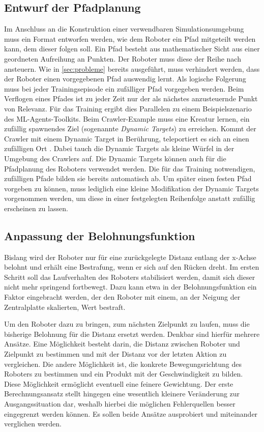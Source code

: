 \subsection{Entwurf der Pfadplanung}
Im Anschluss an die Konstruktion einer verwendbaren Simulationsumgebung muss ein Format entworfen werden, wie dem Roboter ein Pfad mitgeteilt werden kann, dem dieser folgen soll.
Ein Pfad besteht aus mathematischer Sicht aus einer geordneten Aufreihung an Punkten.
Der Roboter muss diese der Reihe nach ansteuern.
Wie in \autoref{sec:probleme} bereits ausgeführt, muss verhindert werden, dass der Roboter einen vorgegebenen Pfad auswendig lernt.
Als logische Folgerung muss bei jeder Trainingsepisode ein zufälliger Pfad vorgegeben werden.
Beim Verflogen eines Pfades ist zu jeder Zeit nur der als nächstes anzusteuernde Punkt von Relevanz.
Für das Training ergibt dies Parallelen zu einem Beispielszenario des ML-Agents-Toolkits.
Beim Crawler-Example muss eine Kreatur lernen, ein zufällig spawnendes Ziel (sogenannte \emph{Dynamic Targets}) zu erreichen.
Kommt der Crawler mit einem Dynamic Target in Berührung, teleportiert es sich an einen zufälligen Ort \cite{crawlerExample}.
Dabei tauch die Dynamic Targets als kleine Würfel in der Umgebung des Crawlers auf.
Die Dynamic Targets können auch für die Pfadplanung des Roboters verwendet werden.
Die für das Training notwendigen, zufälligen Pfade bilden sie bereits automatisch ab.
Um später einen festen Pfad vorgeben zu können, muss lediglich eine kleine Modifikation der Dynamic Targets vorgenommen werden, um diese in einer festgelegten Reihenfolge anstatt zufällig erscheinen zu lassen.

\subsection{Anpassung der Belohnungsfunktion}
Bislang wird der Roboter nur für eine zurückgelegte Distanz entlang der x-Achse belohnt und erhält eine Bestrafung, wenn er sich auf den Rücken dreht.
Im ersten Schritt soll das Laufverhalten des Roboters stabilisiert werden, damit sich dieser nicht mehr springend fortbewegt.
Dazu kann etwa in der Belohnungsfunktion ein Faktor eingebracht werden, der den Roboter mit einem, an der Neigung der Zentralplatte skalierten, Wert bestraft.

Um den Roboter dazu zu bringen, zum nächsten Zielpunkt zu laufen, muss die bisherige Belohnung für die Distanz ersetzt werden.
Denkbar sind hierfür mehrere Ansätze.
Eine Möglichkeit besteht darin, die Distanz zwischen Roboter und Zielpunkt zu bestimmen und mit der Distanz vor der letzten Aktion zu vergleichen.
Die andere Möglichkeit ist, die konkrete Bewegungsrichtung des Roboters zu bestimmen und ein Produkt mit der Geschwindigkeit zu bilden.
Diese Möglichkeit ermöglicht eventuell eine feinere Gewichtung.
Der erste Berechnungsansatz stellt hingegen eine wesentlich kleinere Veränderung zur Ausgangssituation dar, weshalb hierbei die möglichen Fehlerquellen besser eingegrenzt werden können.
Es sollen beide Ansätze ausprobiert und miteinander verglichen werden.

